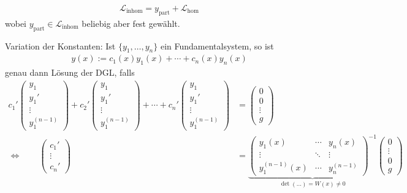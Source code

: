 \begin{theorem}
\begin{enum-arab}
    \begin{enum-alph}
    \item
      \begin{align*}
        \mathcal L_{\text{inhom}} = y_{\text{part}} + \mathcal L_{\text{hom}}
      \end{align*}
      wobei $y_{\text{part}} \in \mathcal L_{\text{inhom}}$ beliebig aber fest gewählt.
    \item
      Variation der Konstanten: Ist $\{y_1, \dotsc, y_n\}$ ein Fundamentalsystem, so ist
      \begin{align*}
        y(x) := c_1(x) y_1(x) + \dotsb + c_n(x)y_n(x)
      \end{align*}
      genau dann Lösung der DGL, falls
      \begin{align*}
        c_1' \begin{pmatrix}
          y_1 \\ y_1' \\ \vdots \\ y_1^{(n-1)}
        \end{pmatrix} +
        c_2' \begin{pmatrix}
          y_1 \\ y_1' \\ \vdots \\ y_1^{(n-1)}
        \end{pmatrix} + \dotsb +
        c_n' \begin{pmatrix}
          y_1 \\ y_1' \\ \vdots \\ y_1^{(n-1)}
        \end{pmatrix} &= \begin{pmatrix}
          0 \\ 0 \\ \vdots \\ g
        \end{pmatrix} \\
        \iff \qquad
        \begin{pmatrix}
          c_1' \\ \vdots \\ c_n'
        \end{pmatrix} &=
        \underbrace{\begin{pmatrix}
            y_1(x) & \cdots & y_n(x) \\
            \vdots & \ddots & \vdots \\
            y_1^{(n-1)}(x) & \cdots & y_n^{(n-1)}
          \end{pmatrix}^{-1}}_{\det(\dotso) = W(x) \neq 0} \begin{pmatrix}
          0 \\ \vdots \\ 0 \\ g
        \end{pmatrix}
      \end{align*}
    \end{enum-alph}
  \end{enum-arab}
\end{theorem}


